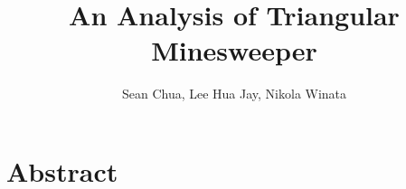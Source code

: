 \documentclass{article}
\title{An Analysis of Triangular Minesweeper}
\author{Sean Chua, Lee Hua Jay, Nikola Winata}
\begin{document}
\maketitle

\section{Abstract}
\end{document}
